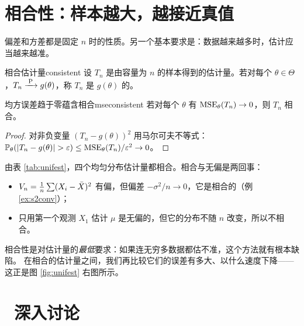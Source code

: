 \section{相合性：样本越大，越接近真值}

偏差和方差都是固定 $n$ 时的性质。另一个基本要求是：数据越来越多时，估计应当越来越准。

\begin{definition}{相合估计量}{consistent}
设 $T_n$ 是由容量为 $n$ 的样本得到的估计量。若对每个 $\theta\in\Theta$，$T_n\xrightarrow{\;\mathrm{P}\;} g(\theta)$，称 $T_n$ 是 $g(\theta)$ 的。
\end{definition}

\begin{proposition}{均方误差趋于零蕴含相合}{mseconsistent}
若对每个 $\theta$ 有 $\operatorname{MSE}_\theta(T_n)\to0$，则 $T_n$ 相合。
\end{proposition}
\begin{proof}
对非负变量 $(T_n-g(\theta))^2$ 用马尔可夫不等式：$\P_\theta(|T_n-g(\theta)|>\varepsilon)\le\MSE_\theta(T_n)/\varepsilon^2\to0$。
\end{proof}

由表 \ref{tab:unifest}，四个均匀分布估计量都相合。相合与无偏是两回事：
\begin{itemize}
\item $V_n=\frac1n\sum(X_i-\bar{X})^2$ 有偏，但偏差 $-\sigma^2/n\to0$，它是相合的（例 \ref{ex:s2conv}）；
\item 只用第一个观测 $X_1$ 估计 $\mu$ 是无偏的，但它的分布不随 $n$ 改变，所以不相合。
\end{itemize}

\begin{intuition}
相合性是对估计量的\emph{最低}要求：如果连无穷多数据都估不准，这个方法就有根本缺陷。
在相合的估计量之间，我们再比较它们的误差有多大、以什么速度下降——这正是图 \ref{fig:unifest} 右图所示。
\end{intuition}

\section{\starmark\ 深入讨论}

